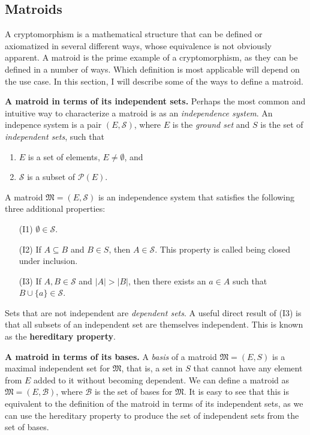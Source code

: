 \subsection{Matroids}\label{background/matroids}
A cryptomorphism is a mathematical structure that can be defined or axiomatized in several different ways, whose equivalence is not obviously apparent. A matroid is the prime example of a cryptomorphism, as they can be defined in a number of ways. Which definition is most applicable will depend on the use case. In this section, I will describe some of the ways to define a matroid.



\textbf{A matroid in terms of its independent sets.} Perhaps the most common and intuitive way to characterize a matroid is as an \textit{independence system}. An indepence system is a pair $(E,\mathcal{S})$, where $E$ is the \textit{ground set} and $S$ is the set of \textit{independent sets}, such that

\begin{enumerate}[align=left]
  \item $E$ is a set of elements, $E \not = \emptyset$, and
  \item $\mathcal{S}$ is a subset of $\mathcal{P}(E)$.
\end{enumerate}

A matroid $\mathfrak{M} = (E, \mathcal{S})$ is an independence system that satisfies the following three additional properties:

\begin{enumerate}[align=left]
  \item [(I1)] $\emptyset \in \mathcal{S}$.
  \item [(I2)] If $A \subseteq B$ and $B \in S$, then $A \in \mathcal{S}$. This property is called being closed under inclusion.
  \item [(I3)] If $A,B \in \mathcal{S}$ and $|A| > |B|$, then there exists an $a \in A$ such that $B \cup \{a\} \in \mathcal{S}$.
\end{enumerate}

Sets that are not independent are \textit{dependent sets}. A useful direct result of (I3) is that all subsets of an independent set are themselves independent. This is known as the \textbf{hereditary property}.



\textbf{A matroid in terms of its bases.} A \textit{basis} of a matroid $\mathfrak{M} = (E,S)$ is a maximal independent set for $\mathfrak{M}$, that is, a set in $S$ that cannot have any element from $E$ added to it without becoming dependent. We can define a matroid as $\mathfrak{M} = (E, \mathcal{B})$, where $\mathcal{B}$ is the set of bases for $\mathfrak{M}$. It is easy to see that this is equivalent to the definition of the matroid in terms of its independent sets, as we can use the hereditary property to produce the set of independent sets from the set of bases.


